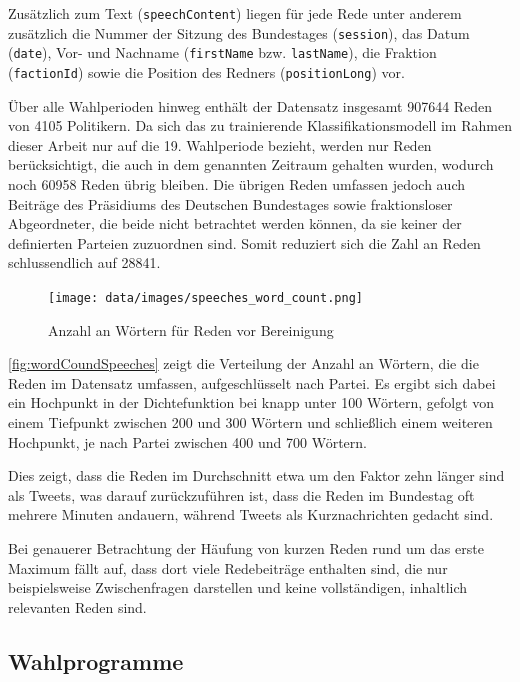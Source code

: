 Zusätzlich zum Text (\texttt{speechContent}) liegen für jede Rede unter anderem zusätzlich die Nummer der Sitzung des Bundestages (\texttt{session}), das Datum (\texttt{date}), Vor- und Nachname (\texttt{firstName} bzw. \texttt{lastName}), die Fraktion (\texttt{factionId}) sowie die Position des Redners (\texttt{positionLong}) vor.

Über alle Wahlperioden hinweg enthält der Datensatz insgesamt \num{907644} Reden von \num{4105} Politikern. Da sich das zu trainierende Klassifikationsmodell im Rahmen dieser Arbeit nur auf die 19. Wahlperiode bezieht, werden nur Reden berücksichtigt, die auch in dem genannten Zeitraum gehalten wurden, wodurch noch \num{60958} Reden übrig bleiben. Die übrigen Reden umfassen jedoch auch Beiträge des Präsidiums des Deutschen Bundestages sowie fraktionsloser Abgeordneter, die beide nicht betrachtet werden können, da sie keiner der definierten Parteien zuzuordnen sind. Somit reduziert sich die Zahl an Reden schlussendlich auf \num{28841}.


\begin{figure}[H]
    \centering
    \texttt{[image: data/images/speeches\_word\_count.png]}
    \caption{Anzahl an Wörtern für Reden vor Bereinigung} \label{fig:wordCoundSpeeches}
\end{figure}

\autoref{fig:wordCoundSpeeches} zeigt die Verteilung der Anzahl an Wörtern, die die Reden im Datensatz umfassen, aufgeschlüsselt nach Partei. Es ergibt sich dabei ein Hochpunkt in der Dichtefunktion bei knapp unter 100 Wörtern, gefolgt von einem Tiefpunkt zwischen \num{200} und \num{300} Wörtern und schließlich einem weiteren Hochpunkt, je nach Partei zwischen 400 und 700 Wörtern.

Dies zeigt, dass die Reden im Durchschnitt etwa um den Faktor zehn länger sind als Tweets, was darauf zurückzuführen ist, dass die Reden im Bundestag oft mehrere Minuten andauern, während Tweets als Kurznachrichten gedacht sind.

Bei genauerer Betrachtung der Häufung von kurzen Reden rund um das erste Maximum fällt auf, dass dort viele Redebeiträge enthalten sind, die nur beispielsweise Zwischenfragen darstellen und keine vollständigen, inhaltlich relevanten Reden sind.


\subsection*{Wahlprogramme}

